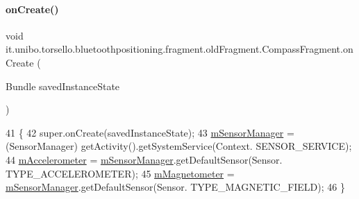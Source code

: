 \paragraph{\texorpdfstring{on\+Create()}{onCreate()}}
{\footnotesize\ttfamily void it.\+unibo.\+torsello.\+bluetoothpositioning.\+fragment.\+old\+Fragment.\+Compass\+Fragment.\+on\+Create (\begin{DoxyParamCaption}\item[{Bundle}]{saved\+Instance\+State }\end{DoxyParamCaption})}


\begin{DoxyCode}
41                                                     \{
42         super.onCreate(savedInstanceState);
43         \hyperlink{classit_1_1unibo_1_1torsello_1_1bluetoothpositioning_1_1fragment_1_1oldFragment_1_1CompassFragment_a9006c75f41300481eaa95c6bb02143e3_a9006c75f41300481eaa95c6bb02143e3}{mSensorManager} = (SensorManager) getActivity().getSystemService(Context.
      SENSOR\_SERVICE);
44         \hyperlink{classit_1_1unibo_1_1torsello_1_1bluetoothpositioning_1_1fragment_1_1oldFragment_1_1CompassFragment_a9f521d80f0f7b0e89bb26951c2e463c0_a9f521d80f0f7b0e89bb26951c2e463c0}{mAccelerometer} = \hyperlink{classit_1_1unibo_1_1torsello_1_1bluetoothpositioning_1_1fragment_1_1oldFragment_1_1CompassFragment_a9006c75f41300481eaa95c6bb02143e3_a9006c75f41300481eaa95c6bb02143e3}{mSensorManager}.getDefaultSensor(Sensor.
      TYPE\_ACCELEROMETER);
45         \hyperlink{classit_1_1unibo_1_1torsello_1_1bluetoothpositioning_1_1fragment_1_1oldFragment_1_1CompassFragment_a9e3cd0081d45a26094a8395fe67736c6_a9e3cd0081d45a26094a8395fe67736c6}{mMagnetometer} = \hyperlink{classit_1_1unibo_1_1torsello_1_1bluetoothpositioning_1_1fragment_1_1oldFragment_1_1CompassFragment_a9006c75f41300481eaa95c6bb02143e3_a9006c75f41300481eaa95c6bb02143e3}{mSensorManager}.getDefaultSensor(Sensor.
      TYPE\_MAGNETIC\_FIELD);
46     \}
\end{DoxyCode}
\hypertarget{classit_1_1unibo_1_1torsello_1_1bluetoothpositioning_1_1fragment_1_1oldFragment_1_1CompassFragment_ad0f88e0af547fa37b29081074023effb_ad0f88e0af547fa37b29081074023effb}{}\label{classit_1_1unibo_1_1torsello_1_1bluetoothpositioning_1_1fragment_1_1oldFragment_1_1CompassFragment_ad0f88e0af547fa37b29081074023effb_ad0f88e0af547fa37b29081074023effb} 
